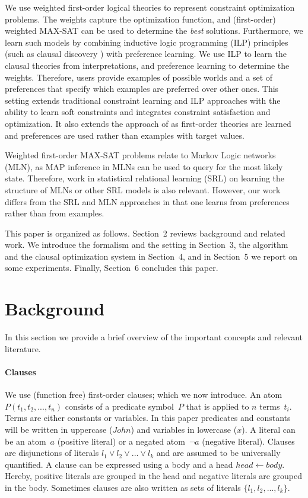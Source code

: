 \documentclass[letterpaper]{article}
\theoremstyle{definition}
\begin{document}
We use weighted first-order logical theories to represent constraint optimization problems.
The weights capture the optimization function, and (first-order) weighted MAX-SAT can be used to determine the \emph{best} solutions.
Furthermore, we learn such models by combining inductive logic programming (ILP) principles (such as clausal discovery \cite{DeRaedt:ClausalDiscovery}) with preference learning.
We use ILP to learn the clausal theories from interpretations, and preference learning to determine the weights.
Therefore, users provide examples of possible worlds and a set of preferences that specify which examples are preferred over other ones.
This setting extends traditional constraint learning and ILP approaches with the ability to learn soft constraints and integrates constraint satisfaction and optimization.
It also extends the approach of \cite{campigotto2011active} as first-order theories are learned and preferences are used rather than examples with target values.

Weighted first-order MAX-SAT problems relate to Markov Logic networks (MLN), as MAP inference in MLNs can be used to query for the most likely state.
Therefore, work in statistical relational learning (SRL) on learning the structure of MLNs or other SRL models \cite{kok2005learning} is also relevant.
However, our work differs from the SRL and MLN approaches in that one learns from preferences rather than from examples.

This paper is organized as follows.
Section~2 reviews background and related work.
We introduce the formalism and the setting in Section~3, the algorithm and the clausal optimization system in Section~4, and in Section~5 we report on some experiments.
Finally, Section~6 concludes this paper.


\section{Background}
In this section we provide a brief overview of the important concepts and relevant literature.

\paragraph{Clauses}
We use (function free) first-order clauses; which we now introduce.
An atom $P(t_1, t_2, ..., t_n)$ consists of a predicate symbol~$P$ that is applied to $n$ terms~$t_i$.
Terms are either constants or variables.
In this paper predicates and constants will be written in uppercase ($\mathit{John}$) and variables in lowercase ($\mathit{x}$).
A literal can be an atom~$a$ (positive literal) or a negated atom~$\lnot a$ (negative literal).
Clauses are disjunctions of literals $l_1 \lor l_2 \lor ... \lor l_k$ and are assumed to be universally quantified.
A clause can be expressed using a body and a head $\mathit{head} \leftarrow \mathit{body}$.
Hereby, positive literals are grouped in the head and negative literals are grouped in the body.
Sometimes clauses are also written as sets of literals $\{l_1, l_2, ..., l_k\}$.
\end{document}
